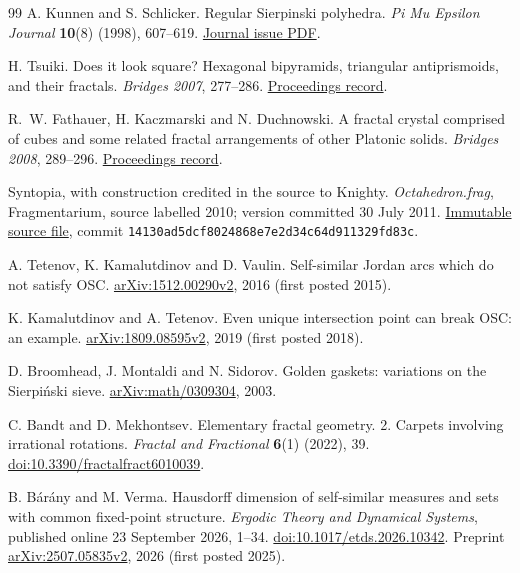 \begin{thebibliography}{99}
A. Kunnen and S. Schlicker.
Regular Sierpinski polyhedra.
\emph{Pi Mu Epsilon Journal} \textbf{10}(8) (1998), 607--619.
\href{https://www.pme-math.org/journal/issues/PMEJ.Vol.10.No.8.pdf}{Journal issue PDF}.

H. Tsuiki.
Does it look square? Hexagonal bipyramids, triangular antiprismoids,
and their fractals.
\emph{Bridges 2007}, 277--286.
\href{https://archive.bridgesmathart.org/2007/bridges2007-277.html}{Proceedings record}.

R.~W. Fathauer, H. Kaczmarski and N. Duchnowski.
A fractal crystal comprised of cubes and some related fractal arrangements
of other Platonic solids.
\emph{Bridges 2008}, 289--296.
\href{https://archive.bridgesmathart.org/2008/bridges2008-289.html}{Proceedings record}.

Syntopia, with construction credited in the source to Knighty.
\emph{Octahedron.frag}, Fragmentarium, source labelled 2010;
version committed 30 July 2011.
\href{https://github.com/Syntopia/Fragmentarium/blob/14130ad5dcf8024868e7e2d34c64d911329fd83c/Fragmentarium-Source/Examples/Kaleidoscopic\%20IFS/Octahedron.frag}{Immutable source file},
commit \texttt{14130ad5dcf8024868e7e2d34c64d911329fd83c}.

A. Tetenov, K. Kamalutdinov and D. Vaulin.
Self-similar Jordan arcs which do not satisfy OSC.
\href{https://arxiv.org/abs/1512.00290v2}{arXiv:1512.00290v2}, 2016
(first posted 2015).

K. Kamalutdinov and A. Tetenov.
Even unique intersection point can break OSC: an example.
\href{https://arxiv.org/abs/1809.08595v2}{arXiv:1809.08595v2}, 2019
(first posted 2018).

D. Broomhead, J. Montaldi and N. Sidorov.
Golden gaskets: variations on the Sierpi\'nski sieve.
\href{https://arxiv.org/abs/math/0309304}{arXiv:math/0309304}, 2003.

C. Bandt and D. Mekhontsev.
Elementary fractal geometry. 2. Carpets involving irrational rotations.
\emph{Fractal and Fractional} \textbf{6}(1) (2022), 39.
\href{https://doi.org/10.3390/fractalfract6010039}{doi:10.3390/fractalfract6010039}.

B. B\'ar\'any and M. Verma.
Hausdorff dimension of self-similar measures and sets with common fixed-point
structure.
\emph{Ergodic Theory and Dynamical Systems}, published online 23 September 2026,
1--34.
\href{https://doi.org/10.1017/etds.2026.10342}{doi:10.1017/etds.2026.10342}.
Preprint \href{https://arxiv.org/abs/2507.05835v2}{arXiv:2507.05835v2}, 2026
(first posted 2025).
\end{thebibliography}
